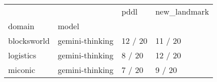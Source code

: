 \begin{tabular}{llll}
\toprule
 &  & pddl & new\_landmark \\
domain & model &  &  \\
\midrule
blocksworld & gemini-thinking & 12 / 20 & 11 / 20 \\
\cline{1-4}
logistics & gemini-thinking & 8 / 20 & 12 / 20 \\
\cline{1-4}
miconic & gemini-thinking & 7 / 20 & 9 / 20 \\
\cline{1-4}
\end{tabular}